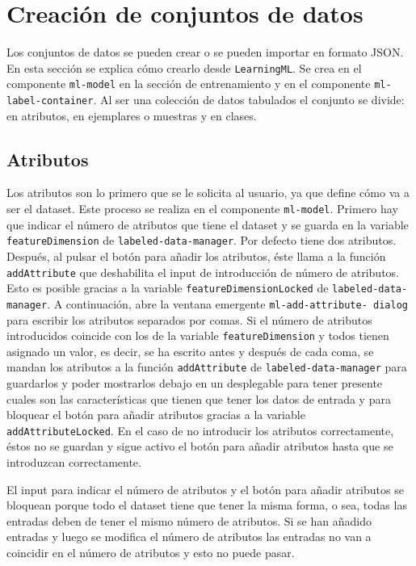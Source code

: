 \documentclass[a4paper, 12pt]{book}
\begin{document}
\section{Creación de conjuntos de datos} 
\label{sec:crear conjunto de datos}

Los conjuntos de datos se pueden crear o se pueden importar en formato JSON. En esta sección se explica cómo crearlo desde \texttt{LearningML}. 
Se crea en el componente \texttt{ml-model} en la sección de entrenamiento y en el componente \texttt{ml-label-container}. 
Al ser una colección de datos tabulados el conjunto se divide: en atributos, en ejemplares o muestras y en clases. 

\subsection{Atributos}
\label{subsec:atributos}

Los atributos son lo primero que se le solicita al usuario, ya que define cómo va a ser el dataset. 
Este proceso se realiza en el componente \texttt{ml-model}. 
Primero hay que indicar el número de atributos que tiene el dataset y se guarda en la variable \texttt{featureDimension} de \texttt{labeled-data-manager}. Por defecto tiene dos atributos. 
Después, al pulsar el botón para añadir los atributos, éste llama a la función \texttt{addAttribute} que deshabilita el input de introducción de número de atributos. Esto es posible gracias a la variable \texttt{featureDimensionLocked} de \texttt{labeled-data-manager}.
A continuación, abre la ventana emergente \texttt{ml-add-attribute-
dialog} para escribir los atributos separados por comas. 
Si el número de atributos introducidos coincide con los de la variable \texttt{featureDimension} y todos tienen asignado un valor, es decir, se ha escrito antes y después de cada coma, se mandan los atributos a la función \texttt{addAttribute} de \texttt{labeled-data-manager} para guardarlos y poder mostrarlos debajo en un desplegable para tener presente cuales son las características que tienen que tener los datos de entrada y para bloquear el botón para añadir atributos gracias a la variable \texttt{addAttributeLocked}. 
En el caso de no introducir los atributos correctamente, éstos no se guardan y sigue activo el botón para añadir atributos hasta que se introduzcan correctamente.

El input para indicar el número de atributos y el botón para añadir atributos se bloquean porque todo el dataset tiene que tener la misma forma, o sea, todas las entradas deben de tener el mismo número de atributos. Si se han añadido entradas y luego se modifica el número de atributos las entradas no van a coincidir en el número de atributos y esto no puede pasar.
\end{document}

